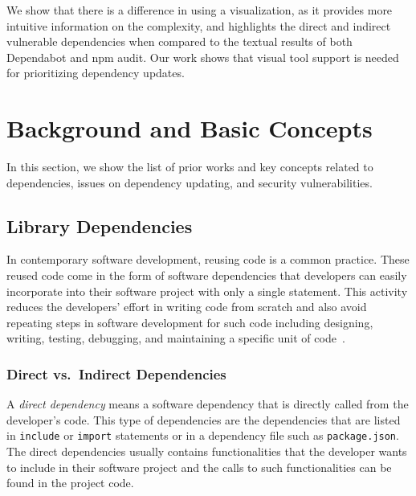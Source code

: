 \documentclass[conference]{IEEEtran}
\begin{document}
	We show that there is a difference in using a visualization, as it provides more intuitive information on the complexity, and highlights the direct and indirect vulnerable dependencies when compared to the textual results of both Dependabot and npm audit.
	Our work shows that  visual tool support is needed for prioritizing dependency updates.
	
	\section{Background and Basic Concepts}
	In this section, we show the list of prior works and key concepts related to dependencies, issues on dependency updating, and security vulnerabilities.
	
	\subsection{Library Dependencies}
	In contemporary software development, reusing code is a common practice. These reused code come in the form of software dependencies that developers can easily incorporate into their software project with only a single statement. This activity reduces the developers' effort in writing code from scratch and also avoid repeating steps in software development for such code including designing, writing, testing, debugging, and maintaining a specific unit of code~\cite{Cox2019}.
	
	\subsubsection{Direct vs.~Indirect Dependencies}
	A \textit{direct dependency} means a software dependency that is directly called from the developer's code. This type of dependencies are the dependencies that are listed in \texttt{include} or \texttt{import} statements or in a dependency file such as \texttt{package.json}. The direct dependencies usually contains functionalities that the developer wants to include in their software project and the calls to such functionalities can be found in the project code. 
	
\end{document}
